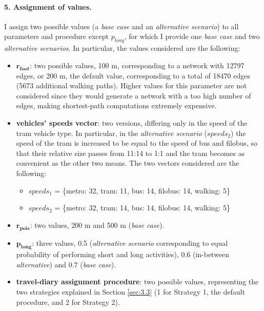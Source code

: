 \paragraph{5. Assignment of values.}
I assign two possible values (a \textit{base case} and an \textit{alternative scenario}) to all parameters and procedure except $p_{long}$, for which I provide one \textit{base case} and two \textit{alternative scenarios}. In particular, the values considered are the following:
\begin{itemize}
    \item $\mathbf{r_{foot}}$: two possible values, 100 m, corresponding to a network with 12797 edges, or 200 m, the default value, corresponding to a total of 18470 edges (5673 additional walking paths). Higher values for this parameter are not considered since they would generate a network with a too high number of edges, making shortest-path computations extremely expensive.
    \item \textbf{vehicles' speeds vector}: two versions, differing only in the speed of the tram vehicle type. In particular, in the \textit{alternative scenario} ($speeds_2$) the speed of the tram is increased to be equal to the speed of bus and filobus, so that their relative size passes from 11:14 to 1:1 and the tram becomes as convenient as the other two means. The two vectors considered are the following:
            \begin{itemize}
                \item $speeds_1$ = \{metro: 32, tram: 11, bus: 14, filobus: 14, walking: 5\}
                \item $speeds_2$ = \{metro: 32, tram: 14, bus: 14, filobus: 14, walking: 5\}
            \end{itemize}
    \item $\mathbf{r_{pois}}$: two values, 200 m and 500 m (\textit{base case}). 
    \item $\mathbf{p_{long}}$: three values, 0.5 (\textit{alternative scenario} corresponding to equal probability of performing short and long activities), 0.6 (in-between \textit{alternative}) and 0.7 (\textit{base case}).
    \item \textbf{travel-diary assignment procedure}: two possible values, representing the two strategies explained in Section \ref{sec:3.3} (1 for Strategy 1, the default procedure, and 2 for Strategy 2).
\end{itemize}


